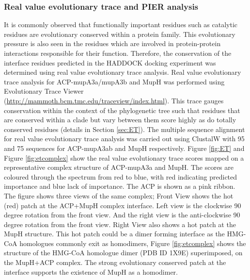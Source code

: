 		\subsubsection{Real value evolutionary trace and PIER analysis}
		\label{sec:RVandPIER}
		It is commonly observed that functionally important residues such as catalytic residues are evolutionary conserved within a protein family. This evolutionary pressure is also seen in the residues which are involved in protein-protein interactions responsible for their function. Therefore, the conservation of the interface residues predicted in the HADDOCK docking experiment was determined using real value evolutionary trace analysis. Real value evolutionary trace analysis \parencite{Lichtarge1996} for ACP-mupA3a/mupA3b and MupH was performed using Evolutionary Trace Viewer \parencite{Morgan2006} (\url{http://mammoth.bcm.tmc.edu/traceview/index.html}). This trace gauges conservation within the context of the phylogenetic tree such that residues that are conserved within a clade but vary between them score highly as do totally conserved residues (details in Section \ref{sec:ET}). The multiple sequence alignment for real value evolutionary trace analysis was carried out using ClustalW with 95 and 75 sequences for ACP-mupA3ab and MupH respectively. Figure \ref{fig:ET} and Figure \ref{fig:etcomplex} show the real value evolutionary trace scores mapped on a representative complex structure of ACP-mupA3a and MupH. The scores are coloured through the spectrum from red to blue, with red indicating predicted importance and blue lack of importance. The ACP is shown as a pink ribbon. The figure shows three views of the same complex; Front View shows the hot (red) patch at the ACP+MupH complex interface. Left view is the clockwise 90 degree rotation from the front view. And the right view is the anti-clockwise 90 degree rotation from the front view. Right View also shows a hot patch at the MupH structure. This hot patch could be a dimer forming interface as the HMG-CoA homologues commonly exit as homodimers, Figure \ref{fig:etcomplex} shows the structure of the HMG-CoA homologue dimer (PDB ID 1X9E) superimposed, on the MupH+ACP complex. The strong evolutionary conserved patch at the interface supports the existence of MupH as a homodimer.

